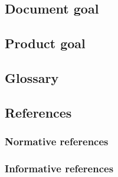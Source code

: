 \subsection{Document goal}

\subsection{Product goal}

\subsection{Glossary}

\subsection{References}
\subsubsection{Normative references}

\subsubsection{Informative references}
